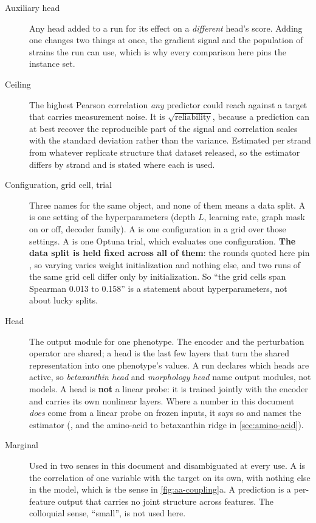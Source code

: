 \begin{description}
\item[Auxiliary head] Any head added to a run for its effect on a \emph{different} head's
  score. Adding one changes two things at once, the gradient signal and the population of
  strains the run can use, which is why every comparison here pins the instance set.

\item[Ceiling] The highest Pearson correlation \emph{any} predictor could reach against a
  target that carries measurement noise. It is $\sqrt{\text{reliability}}$, because a
  prediction can at best recover the reproducible part of the signal and correlation scales
  with the standard deviation rather than the variance. Estimated per strand from whatever
  replicate structure that dataset released, so the estimator differs by strand and is
  stated where each is used.

\item[Configuration, grid cell, trial] Three names for the same object, and none of them
  means a data split. A  is one setting of the hyperparameters (depth
  $L$, learning rate, graph mask on or off, decoder family). A  is one
  configuration in a grid over those settings. A  is one Optuna trial, which
  evaluates one configuration. \textbf{The data split is held fixed across all of them}: the
  rounds quoted here pin , so varying  varies weight
  initialization and nothing else, and two runs of the same grid cell differ only by
  initialization. So ``the grid cells span Spearman 0.013 to 0.158'' is a statement about
  hyperparameters, not about lucky splits.

\item[Head] The output module for one phenotype. The encoder and the perturbation operator
  are shared; a head is the last few layers that turn the shared representation into one
  phenotype's values. A run declares which heads are active, so \emph{betaxanthin head} and
  \emph{morphology head} name output modules, not models. A head is \textbf{not} a linear
  probe: it is trained jointly with the encoder and carries its own nonlinear layers. Where
  a number in this document \emph{does} come from a linear probe on frozen inputs, it says
  so and names the estimator (, and the amino-acid to betaxanthin ridge
  in \cref{sec:amino-acid}).

\item[Marginal] Used in two senses in this document and disambiguated at every use. A
   is the correlation of one variable with the target on its own,
  with nothing else in the model, which is the sense in \cref{fig:aa-coupling}a. A
   prediction is a per-feature output that carries no joint structure across
  features. The colloquial sense, ``small'', is not used here.


\end{description}
